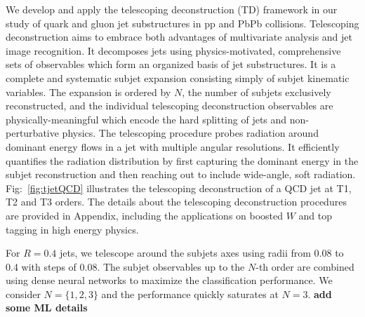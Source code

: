 \documentclass[notoc]{JHEP3}
\begin{document}
We develop and apply the telescoping deconstruction (TD) framework in our study of quark and gluon jet substructures in pp and PbPb collisions. Telescoping deconstruction aims to embrace both advantages of multivariate analysis and jet image recognition. It decomposes jets using physics-motivated, comprehensive sets of observables which form an organized basis of jet substructures. It is a complete and systematic subjet expansion consisting simply of subjet kinematic variables. The expansion is ordered by $N$, the number of subjets exclusively reconstructed, and the individual telescoping deconstruction observables are physically-meaningful which encode the hard splitting of jets and non-perturbative physics. The telescoping procedure probes radiation around dominant energy flows in a jet with multiple angular resolutions. It efficiently quantifies the radiation distribution by first capturing the dominant energy in the subjet reconstruction and then reaching out to include wide-angle, soft radiation. Fig:~\ref{fig:tjetQCD} illustrates the telescoping deconstruction of a QCD jet at T1, T2 and T3 orders. The details about the telescoping deconstruction procedures are provided in Appendix, including the applications on boosted $W$ and top tagging in high energy physics.

For $R=0.4$ jets, we telescope around the subjets axes using radii from 0.08 to 0.4 with steps of 0.08. The subjet observables up to the $N$-th order are combined using dense neural networks to maximize the classification performance. We consider $N=\{1,2,3\}$ and the performance quickly saturates at $N=3$. {\bf add some ML details}
\end{document}
